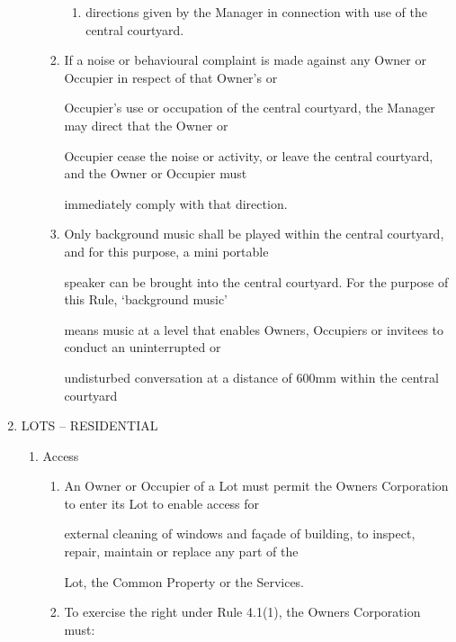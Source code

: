 \documentclass{article}
\begin{document}
\begin{enumerate}[label=\arabic*.]
\begin{enumerate}[label=\arabic{enumi}.\arabic*.]
\begin{enumerate}[label=(\arabic*)]
\begin{enumerate}[label=(\alph*)]
\item {\fontsize{9.962}{1} directions given by the Manager in connection with use of the central courtyard. }

\end{enumerate}
\item {\fontsize{9.962}{1} If a noise or behavioural complaint is made against any Owner or Occupier in respect of that Owner’s or }

{\fontsize{10.02}{1}Occupier’s use or occupation of the central courtyard, the Manager may direct that the Owner or }

{\fontsize{10.02}{1}Occupier cease the noise or activity, or leave the central courtyard, and the Owner or Occupier must }

{\fontsize{10.02}{1}immediately comply with that direction. }

\item {\fontsize{9.962}{1} Only background music shall be played within the central courtyard, and for this purpose, a mini portable }

{\fontsize{10.02}{1}speaker can be brought into the central courtyard. For the purpose of this Rule, ‘background music’ }

{\fontsize{10.02}{1}means music at a level that enables Owners, Occupiers or invitees to conduct an uninterrupted or }

{\fontsize{10.02}{1}undisturbed conversation at a distance of 600mm within the central courtyard  }

\end{enumerate}
\end{enumerate}
\item {\fontsize{9.99}{1} LOTS – RESIDENTIAL }

\begin{enumerate}[label=\arabic{enumi}.\arabic*.]
\item {\fontsize{9.99}{1} Access }

\begin{enumerate}[label=(\arabic*)]
\item {\fontsize{9.962}{1} An Owner or Occupier of a Lot must permit the Owners Corporation to enter its Lot to enable access for }

{\fontsize{10.02}{1}external cleaning of windows and façade of building, to inspect, repair, maintain or replace any part of the }

{\fontsize{10.02}{1}Lot, the Common Property or the Services. }

\item {\fontsize{9.962}{1} To exercise the right under Rule 4.1(1), the Owners Corporation must: }


\end{enumerate}
\end{enumerate}
\end{enumerate}
\end{document}
